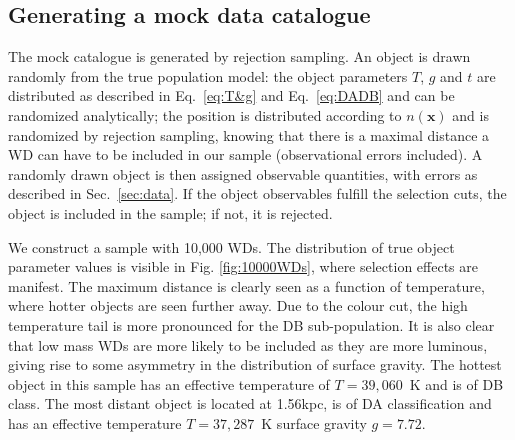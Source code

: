 \documentclass[fleqn,usenatbib]{mnras}
\newcommand{\Teff}{T}
\newcommand{\logg}{g}
\begin{document}
\subsection{Generating a mock data catalogue}

The mock catalogue is generated by rejection sampling. An object is drawn randomly from the true population model: the object parameters $\Teff$, $\logg$ and $t$ are distributed as described in Eq.~\eqref{eq:T&g} and Eq.~\eqref{eq:DADB} and can be randomized analytically; the position is distributed according to $n(\mathbf{x})$ and is randomized by rejection sampling, knowing that there is a maximal distance a WD can have to be included in our sample (observational errors included). A randomly drawn object is then assigned observable quantities, with errors as described in Sec.~\ref{sec:data}. If the object observables fulfill the selection cuts, the object is included in the sample; if not, it is rejected.

We construct a sample with 10,000 WDs. The distribution of true object parameter values is visible in Fig. \ref{fig:10000WDs}, where selection effects are manifest. The maximum distance is clearly seen as a function of temperature, where hotter objects are seen further away. Due to the colour cut, the high temperature tail is more pronounced for the DB sub-population. It is also clear that low mass WDs are more likely to be included as they are more luminous, giving rise to some asymmetry in the distribution of surface gravity. The hottest object in this sample has an effective temperature of $\Teff=39,060$~K and is of DB class. The most distant object is located at 1.56kpc, is of DA classification and has an effective temperature $\Teff=37,287$~K surface gravity $\logg=7.72$.
\end{document}

